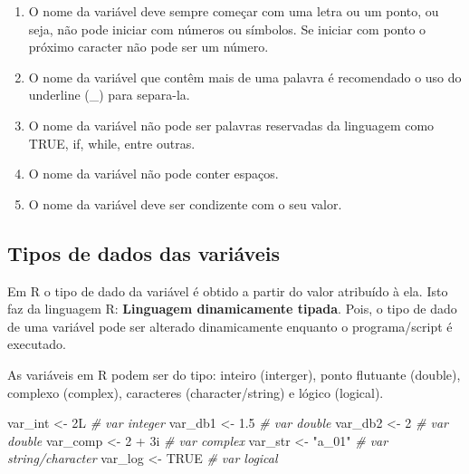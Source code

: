 \documentclass[
]{book}
\newenvironment{Shaded}{\begin{snugshade}}{\end{snugshade}}
\newcommand{\CommentTok}[1]{\textcolor[rgb]{0.56,0.35,0.01}{\textit{#1}}}
\newcommand{\ConstantTok}[1]{\textcolor[rgb]{0.00,0.00,0.00}{#1}}
\newcommand{\DecValTok}[1]{\textcolor[rgb]{0.00,0.00,0.81}{#1}}
\newcommand{\FloatTok}[1]{\textcolor[rgb]{0.00,0.00,0.81}{#1}}
\newcommand{\NormalTok}[1]{#1}
\newcommand{\OtherTok}[1]{\textcolor[rgb]{0.56,0.35,0.01}{#1}}
\newcommand{\SpecialCharTok}[1]{\textcolor[rgb]{0.00,0.00,0.00}{#1}}
\newcommand{\StringTok}[1]{\textcolor[rgb]{0.31,0.60,0.02}{#1}}
\theoremstyle{definition}
\theoremstyle{definition}
\theoremstyle{definition}
\theoremstyle{definition}
\theoremstyle{remark}
\begin{document}
\begin{enumerate}
\def\labelenumi{\arabic{enumi}.}
\item
  O nome da variável deve sempre começar com uma letra ou um ponto, ou seja, não pode iniciar com números ou símbolos. Se iniciar com ponto o próximo caracter não pode ser um número.
\item
  O nome da variável que contêm mais de uma palavra é recomendado o uso do underline (\_) para separa-la.
\item
  O nome da variável não pode ser palavras reservadas da linguagem como TRUE, if, while, entre outras.
\item
  O nome da variável não pode conter espaços.
\item
  O nome da variável deve ser condizente com o seu valor.
\end{enumerate}

\hypertarget{tipos-de-dados-das-variuxe1veis}{%
\subsection{Tipos de dados das variáveis}\label{tipos-de-dados-das-variuxe1veis}}

Em R o tipo de dado da variável é obtido a partir do valor atribuído à ela. Isto faz da linguagem R: \textbf{Linguagem dinamicamente tipada}. Pois, o tipo de dado de uma variável pode ser alterado dinamicamente enquanto o programa/script é executado.

As variáveis em R podem ser do tipo: inteiro (interger), ponto flutuante (double), complexo (complex), caracteres (character/string) e lógico (logical).

\begin{Shaded}
\begin{Highlighting}[]
\NormalTok{var\_int }\OtherTok{\textless{}{-}}\NormalTok{ 2L      }\CommentTok{\# var integer}
\NormalTok{var\_db1 }\OtherTok{\textless{}{-}} \FloatTok{1.5}     \CommentTok{\# var double}
\NormalTok{var\_db2 }\OtherTok{\textless{}{-}} \DecValTok{2}       \CommentTok{\# var double}
\NormalTok{var\_comp }\OtherTok{\textless{}{-}} \DecValTok{2} \SpecialCharTok{+}\NormalTok{ 3i }\CommentTok{\# var complex}
\NormalTok{var\_str }\OtherTok{\textless{}{-}} \StringTok{"a\_01"}  \CommentTok{\# var string/character}
\NormalTok{var\_log }\OtherTok{\textless{}{-}} \ConstantTok{TRUE}    \CommentTok{\# var logical}
\end{Highlighting}
\end{Shaded}
\end{document}
